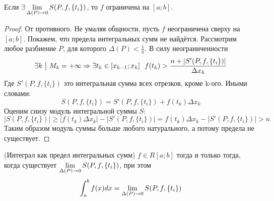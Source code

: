 \begin{lemma}
	Если $\exists \lim\limits_{\Delta(P) \to 0} S(P, f, \{t_i\})$, то $f$ ограничена на $[a; b]$.
\end{lemma}

\begin{proof}
	От противного. Не умаляя общности, пусть $f$ неограничена сверху на $[a; b]$. Покажем, что предела интегральных сумм не найдётся. Рассмотрим любое разбиение $P$, для которого $\Delta(P) < \frac{1}{n}$. В силу неограниченности
	\[
		\exists k \ \big|\  M_k = +\infty \Rightarrow \exists t_k \in [x_{k - 1}; x_k]\ \ f(t_k) > \frac{n + |S'(P, f, \{t_i\})|}{\Delta x_k}
	\]
	Где  $S'(P, f, \{t_i\})$ это интегральная сумма всех отрезков, кроме k-ого. Иными словами:
	\[
		S(P, f, \{t_i\}) = S'(P, f, \{t_i\}) + f(t_k) \Delta x_k
	\]
	Оценим снизу модуль интегральной суммы $S$:
	\[
		|S(P, f, \{t_i\})| \ge |f(t_k) \Delta x_k| - |S'(P, f, \{t_i\})| = f(t_k)\Delta x_k - |S'(P, f, \{t_i\})| > n
	\]
	Таким образом модуль суммы больше любого натурального,  а потому предела не существует.
\end{proof}

\begin{theorem} (Интеграл как предел интегральных сумм)
	$f \in R[a; b]$ тогда и только тогда, когда существует $\lim\limits_{\Delta(P) \to 0} S(P, f, \{t_i\})$, при этом
	\[
		\int_a^b f(x)dx = \lim\limits_{\Delta(P) \to 0} S(P, f, \{t_i\})
	\]
\end{theorem}

